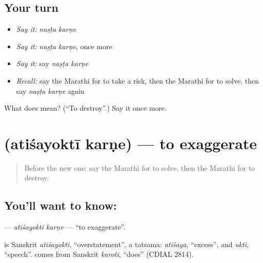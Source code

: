 \subsection*{Your turn}
\begin{itemize}
\raggedright
  \item \emph{Say it:} \emph{naṣṭa karṇe}
  \item \emph{Say it:} \emph{naṣṭa karṇe}, once more
  \item \emph{Say it:} say \emph{naṣṭa karṇe}
  \item \emph{Recall:} say the Marathi for to take a risk, then the Marathi for to solve, then say \emph{naṣṭa karṇe} again
\end{itemize}

\begin{tcolorbox}[breakable,colback=teal!4,colframe=teal!35!black,title={Before you move on}]
What does   mean? (\textquotedblleft{}To destroy\textquotedblright{}.) Say it once more.
\end{tcolorbox}
\section[\texorpdfstring{\mr{अतिशयोक्ती} \mr{करणे} (atiśayoktī karṇe)}{अतिशयोक्ती करणे (atiśayoktī karṇe)}]{  (atiśayoktī karṇe) — to exaggerate}

\label{lesson:MR-C227-atisayokti-karne}



\begin{quote}
Before the new one: say the Marathi for to solve, then the Marathi for to destroy.
\end{quote}

\subsection*{You'll want to know:  }
\textbf{ } — \emph{atiśayoktī karṇe} — \textquotedblleft{}to exaggerate\textquotedblright{}.

\begin{cousinweb}
\textbf{} is Sanskrit \emph{atiśayokti}, \textquotedblleft{}overstatement\textquotedblright{}, a tatsama: \emph{atiśaya}, \textquotedblleft{}excess\textquotedblright{}, and \emph{ukti}, \textquotedblleft{}speech\textquotedblright{}. \textbf{} comes from Sanskrit \emph{karoti}, \textquotedblleft{}does\textquotedblright{} (CDIAL 2814).
\end{cousinweb}

